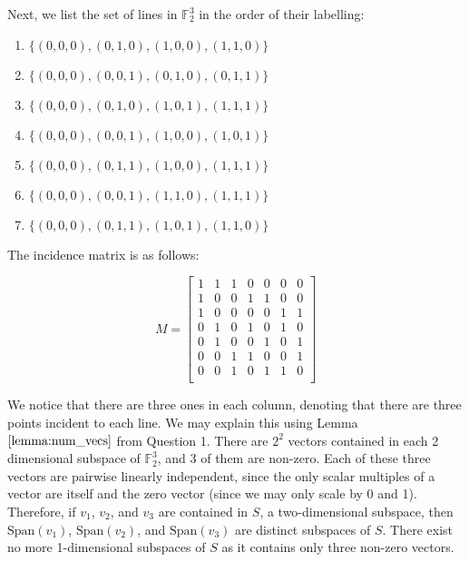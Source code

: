 \documentclass{article}
\newcommand{\F}{\mathbb{F}}
\begin{document}
Next, we list the set of lines in $\F_2^3$ in the order of their labelling:

\begin{enumerate}
    \item $\{(0, 0, 0), (0, 1, 0), (1, 0, 0), (1, 1, 0)\}$
    \item $\{(0, 0, 0), (0, 0, 1), (0, 1, 0), (0, 1, 1)\}$
    \item $\{(0, 0, 0), (0, 1, 0), (1, 0, 1), (1, 1, 1)\}$
    \item $\{(0, 0, 0), (0, 0, 1), (1, 0, 0), (1, 0, 1)\}$
    \item $\{(0, 0, 0), (0, 1, 1), (1, 0, 0), (1, 1, 1)\}$
    \item $\{(0, 0, 0), (0, 0, 1), (1, 1, 0), (1, 1, 1)\}$
    \item $\{(0, 0, 0), (0, 1, 1), (1, 0, 1), (1, 1, 0)\}$
\end{enumerate}

The incidence matrix is as follows:

\[
    M = \begin{bmatrix}
        1 & 1 & 1 & 0 & 0 & 0 & 0 \\
        1 & 0 & 0 & 1 & 1 & 0 & 0 \\
        1 & 0 & 0 & 0 & 0 & 1 & 1 \\
        0 & 1 & 0 & 1 & 0 & 1 & 0 \\
        0 & 1 & 0 & 0 & 1 & 0 & 1 \\
        0 & 0 & 1 & 1 & 0 & 0 & 1 \\
        0 & 0 & 1 & 0 & 1 & 1 & 0 \\
    \end{bmatrix}
\]

We notice that there are three ones in each column, denoting that there are three points incident to each line. We may explain this using Lemma $\ref{lemma:num_vecs}$ from Question 1. There are $2^2$ vectors contained in each 2 dimensional subspace of $\F^3_2$, and $3$ of them are non-zero. Each of these three vectors are pairwise linearly independent, since the only scalar multiples of a vector are itself and the zero vector (since we may only scale by 0 and 1). Therefore, if $v_1$, $v_2$, and $v_3$ are contained in $S$, a two-dimensional subspace, then $\text{Span}(v_1)$, $\text{Span}(v_2)$, and $\text{Span}(v_3)$ are distinct subspaces of $S$. There exist no more 1-dimensional subspaces of $S$ as it contains only three non-zero vectors.
\end{document}
